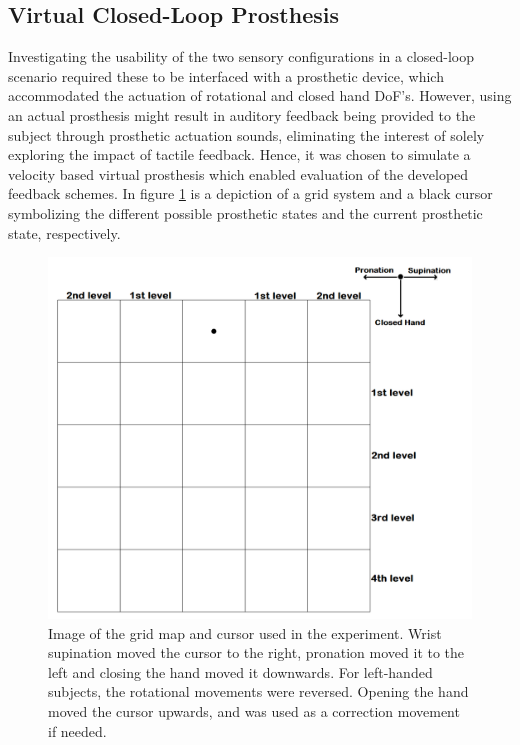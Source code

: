 

\subsection{Virtual Closed-Loop Prosthesis}

Investigating the usability of the two sensory configurations in a closed-loop scenario required these to be interfaced with a prosthetic device, which accommodated the actuation of rotational and closed hand DoF's. However, using an actual prosthesis might result in auditory feedback being provided to the subject through prosthetic actuation sounds, eliminating the interest of solely exploring the impact of tactile feedback. Hence, it was chosen to simulate a velocity based virtual prosthesis which enabled evaluation of the developed feedback schemes. In figure \ref{fig:pa:gridmap} is a depiction of a grid system and a black cursor symbolizing the different possible prosthetic states and the current prosthetic state, respectively.
\begin{figure}[H]                 
	\includegraphics[width=1\textwidth]{figures/gridmap2}  
	\caption{Image of the grid map and cursor used in the experiment. Wrist supination moved the cursor to the right, pronation moved it to the left and closing the hand moved it downwards. For left-handed subjects, the rotational movements were reversed. Opening the hand moved the cursor upwards, and was used as a correction movement if needed.}
	\label{fig:pa:gridmap} 
\end{figure}
